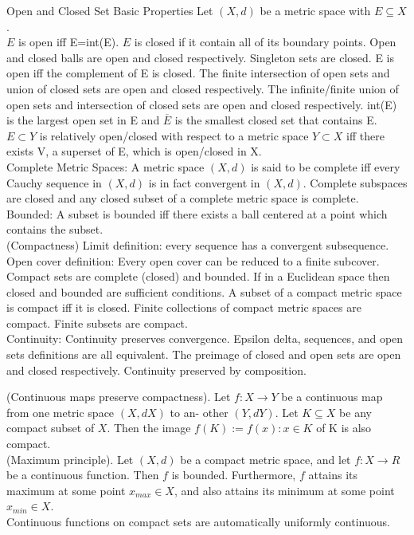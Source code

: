 \documentclass[10pt]{article}
\begin{document}
\begin{small}
Open and Closed Set Basic Properties Let $(X,d)$ be a metric space with $E\subseteq X$.\\
$E$ is open iff E=int(E). $E$ is closed if it contain all of its boundary points. 
Open and closed balls are open and closed respectively. 
Singleton sets are closed.
E is open iff the complement of E is closed.
The finite intersection of open sets and union of closed sets are open and closed respectively.
The infinite/finite union of open sets and intersection of closed sets are open and closed respectively.
int(E) is the largest open set in E and $\overline{E}$ is the smallest closed set that contains E.
$E\subset Y$ is relatively open/closed with respect to a metric space $Y\subset X$ iff there exists V, a superset of E, which is open/closed in X.\\

Complete Metric Spaces: A metric space $(X,d)$ is said to be complete iff every Cauchy sequence in $(X,d)$ is in fact convergent in $(X, d)$.
Complete subspaces are closed and any closed subset of a complete metric space is complete.\\

Bounded: A subset is bounded iff there exists a ball centered at a point which contains the subset.\\

(Compactness) Limit definition: every sequence has a convergent subsequence. Open cover definition: Every open cover can be reduced to a finite subcover.\\
Compact sets are complete (closed) and bounded. If in a Euclidean space then closed and bounded are sufficient conditions. A subset of a compact metric space is compact iff it is closed. 
Finite collections of compact metric spaces are compact. Finite subsets are compact.\\

Continuity: Continuity preserves convergence. 
Epsilon delta, sequences, and open sets definitions are all equivalent. 
The preimage of closed and open sets are open and closed respectively.
Continuity preserved by composition.

(Continuous maps preserve compactness). 
Let $f : X \rightarrow Y$ be a continuous map from one metric space $(X,dX)$ to an- other $(Y, dY )$. 
Let $K \subseteq X$ be any compact subset of $X$. Then the image $f(K) := {f(x) : x \in K}$ of K is also compact.\\

(Maximum principle). 
Let $(X, d)$ be a compact metric space, and let $f : X \rightarrow R$ be a continuous function. 
Then $f$ is bounded. 
Furthermore, $f$ attains its maximum at some point $x_{max} \in X$, and also attains its minimum at some point $x_{min} \in X$.\\
Continuous functions on compact sets are automatically uniformly continuous.\\


\end{small}
\end{document}
